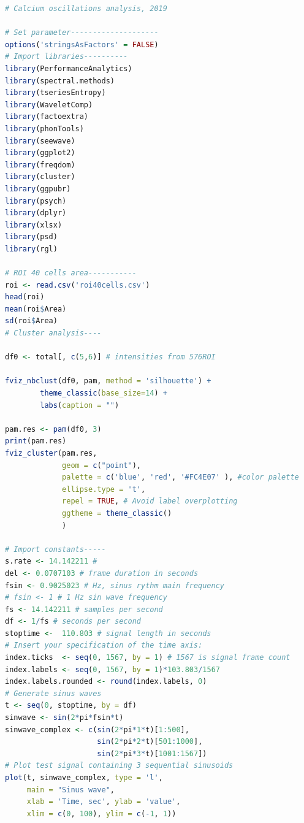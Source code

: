 \documentclass{biophys-new}
\begin{document}
\begin{lstlisting}[language=R]
# Calcium oscillations analysis, 2019

# Set parameter--------------------
options('stringsAsFactors' = FALSE)
# Import libraries----------
library(PerformanceAnalytics)
library(spectral.methods)
library(tseriesEntropy)
library(WaveletComp)
library(factoextra)
library(phonTools)
library(seewave)
library(ggplot2)
library(freqdom)
library(cluster)
library(ggpubr)
library(psych)
library(dplyr)
library(xlsx)
library(psd)
library(rgl)

# ROI 40 cells area-----------
roi <- read.csv('roi40cells.csv')
head(roi)
mean(roi$Area)
sd(roi$Area)
# Cluster analysis----

df0 <- total[, c(5,6)] # intensities from 576ROI

fviz_nbclust(df0, pam, method = 'silhouette') +
        theme_classic(base_size=14) +
        labs(caption = "")

pam.res <- pam(df0, 3)
print(pam.res)
fviz_cluster(pam.res,
             geom = c("point"),
             palette = c('blue', 'red', '#FC4E07' ), #color palette
             ellipse.type = 't',
             repel = TRUE, # Avoid label overplotting
             ggtheme = theme_classic()
             )

# Import constants-----
s.rate <- 14.142211 #
del <- 0.0707103 # frame duration in seconds
fsin <- 0.9025023 # Hz, sinus rythm main frequency
# fsin <- 1 # 1 Hz sin wave frequency
fs <- 14.142211 # samples per second
df <- 1/fs # seconds per second
stoptime <-  110.803 # signal length in seconds
# Insert your specification of the time axis:
index.ticks  <- seq(0, 1567, by = 1) # 1567 is signal frame count
index.labels <- seq(0, 1567, by = 1)*103.803/1567
index.labels.rounded <- round(index.labels, 0)
# Generate sinus waves
t <- seq(0, stoptime, by = df)
sinwave <- sin(2*pi*fsin*t)
sinwave_complex <- c(sin(2*pi*1*t)[1:500],
                     sin(2*pi*2*t)[501:1000],
                     sin(2*pi*3*t)[1001:1567])
# Plot test signal containing 3 sequential sinusoids
plot(t, sinwave_complex, type = 'l',
     main = "Sinus wave",
     xlab = 'Time, sec', ylab = 'value',
     xlim = c(0, 100), ylim = c(-1, 1))


\end{lstlisting}
\end{document}
